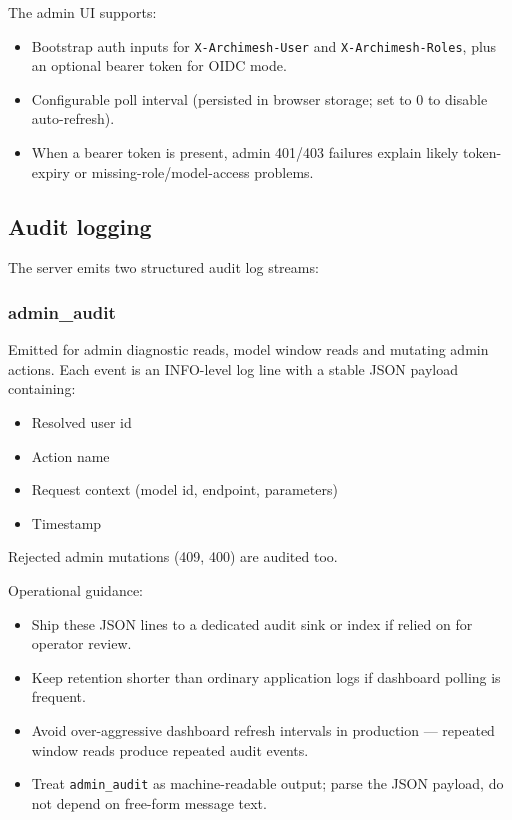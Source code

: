 The admin UI supports:

\begin{itemize}
\item Bootstrap auth inputs for \texttt{X-Archimesh-User} and
  \texttt{X-Archimesh-Roles}, plus an optional bearer token for OIDC mode.
\item Configurable poll interval (persisted in browser storage; set to 0 to
  disable auto-refresh).
\item When a bearer token is present, admin 401/403 failures explain likely
  token-expiry or missing-role/model-access problems.
\end{itemize}

\subsection{Audit logging}

The server emits two structured audit log streams:

\subsubsection{admin\_audit}

Emitted for admin diagnostic reads, model window reads and mutating admin
actions. Each event is an INFO-level log line with a stable JSON payload
containing:

\begin{itemize}
\item Resolved user id
\item Action name
\item Request context (model id, endpoint, parameters)
\item Timestamp
\end{itemize}

Rejected admin mutations (409, 400) are audited too.

Operational guidance:

\begin{itemize}
\item Ship these JSON lines to a dedicated audit sink or index if relied on
  for operator review.
\item Keep retention shorter than ordinary application logs if dashboard
  polling is frequent.
\item Avoid over-aggressive dashboard refresh intervals in production ---
  repeated window reads produce repeated audit events.
\item Treat \texttt{admin\_audit} as machine-readable output; parse the JSON
  payload, do not depend on free-form message text.
\end{itemize}

